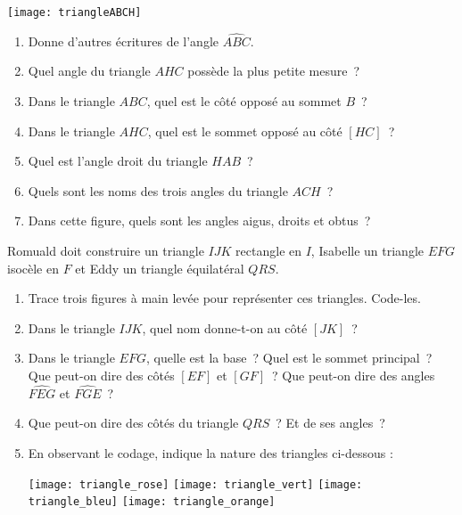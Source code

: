 \begin{activite}

\texttt{[image: triangleABCH]}

\begin{enumerate}
\item Donne d'autres écritures de l'angle $\widehat{ABC}$.

\item Quel angle du triangle $AHC$ possède la plus petite mesure ?

\item Dans le triangle $ABC$, quel est le côté opposé au sommet $B$ ?

\item Dans le triangle $AHC$, quel est le sommet opposé au côté $[HC]$ ?

\item Quel est l'angle droit du triangle $HAB$ ?

\item Quels sont les noms des trois angles du triangle $ACH$ ?

\item Dans cette figure, quels sont les angles aigus, droits et obtus ?
\end{enumerate}

\end{activite}


\begin{activite}

Romuald doit construire un triangle $IJK$ rectangle en $I$, Isabelle un triangle $EFG$ isocèle en $F$ et Eddy un triangle équilatéral $QRS$.

\begin{enumerate}

\item Trace trois figures à main levée pour représenter ces triangles. Code-les.

\item Dans le triangle $IJK$, quel nom donne-t-on au côté $[JK]$ ?

\item Dans le triangle $EFG$, quelle est la base ? Quel est le sommet principal ? Que peut-on dire des côtés $[EF]$ et $[GF]$ ? Que peut-on dire des angles $\widehat{FEG}$ et $\widehat{FGE}$ ?

\item Que peut-on dire des côtés du triangle $QRS$ ? Et de ses angles ?

\item En observant le codage, indique la nature des triangles ci-dessous :

\texttt{[image: triangle\_rose]} \hfill \texttt{[image: triangle\_vert]} \hfill \texttt{[image: triangle\_bleu]} \hfill \texttt{[image: triangle\_orange]}

\end{enumerate}

\end{activite}

